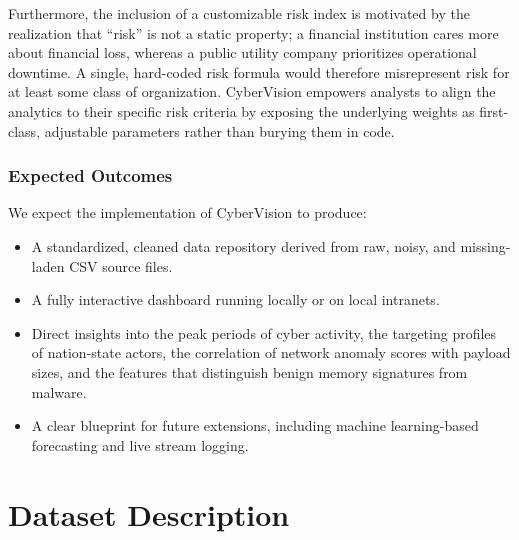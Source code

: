 \documentclass[a4paper, 12pt]{report}
\begin{document}
Furthermore, the inclusion of a customizable risk index is motivated by the realization that ``risk'' is not a static property; a financial institution cares more about financial loss, whereas a public utility company prioritizes operational downtime. A single, hard-coded risk formula would therefore misrepresent risk for at least some class of organization. CyberVision empowers analysts to align the analytics to their specific risk criteria by exposing the underlying weights as first-class, adjustable parameters rather than burying them in code.

\subsection{Expected Outcomes}
We expect the implementation of CyberVision to produce:
\begin{itemize}
    \item A standardized, cleaned data repository derived from raw, noisy, and missing-laden CSV source files.
    \item A fully interactive dashboard running locally or on local intranets.
    \item Direct insights into the peak periods of cyber activity, the targeting profiles of nation-state actors, the correlation of network anomaly scores with payload sizes, and the features that distinguish benign memory signatures from malware.
    \item A clear blueprint for future extensions, including machine learning-based forecasting and live stream logging.
\end{itemize}

\chapter{Dataset Description}
\end{document}
